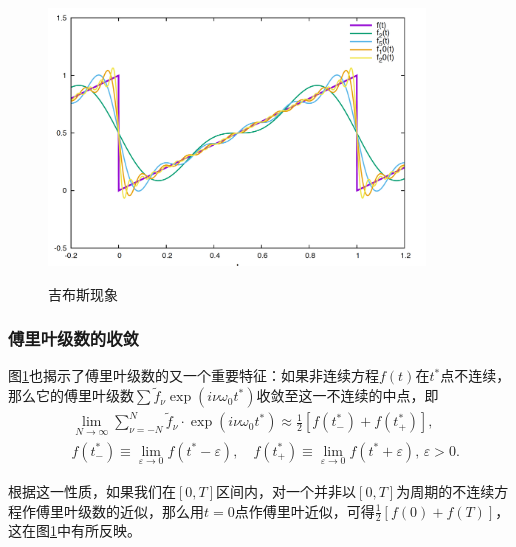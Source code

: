 \begin{figure}[htbp]
   \caption{吉布斯现象}
  \centering
  \includegraphics[width=10cm]{./Figures/20180305-gibbs-phenomenon.png}
  \label{fig:fourier-series-gibbs-phenomenon}
%
\end{figure}

\subsubsection{傅里叶级数的收敛}
\label{sec:fourier-series-convergence}

图\ref{fig:fourier-series-gibbs-phenomenon}也揭示了傅里叶级数的又一个重要特征：如果非连续方程$f(t)$在$t^{*}$点不连续，那么它的傅里叶级数$\sum \tilde{f}_{\nu} \exp \left( i \nu \omega_{0} t^{*} \right)$收敛至这一不连续的中点，即
\begin{equation*}
\begin{split}
  & \lim_{N \rightarrow \infty}
  \sum_{\nu = - N}^{N}
  \tilde{f}_{\nu} \cdot \exp \left( i \nu \omega_{0} t^{*} \right)
  \approx \frac{1}{2}
  \left[
  f \left( t_{-}^{*}\right) + f \left( t_{+}^{*}\right)
  \right], \\
  & f \left( t_{-}^{*}\right) \equiv \lim_{\varepsilon \rightarrow 0} f \left( t^{*} - \varepsilon \right), \quad f \left( t_{+}^{*}\right) \equiv \lim_{\varepsilon \rightarrow 0} f \left( t^{*} + \varepsilon \right), \, \varepsilon > 0.
\end{split}
\end{equation*}

根据这一性质，如果我们在$[0,T]$区间内，对一个并非以$[0,T]$为周期的不连续方程作傅里叶级数的近似，那么用$t=0$点作傅里叶近似，可得$\frac{1}{2} \left[ f(0) + f(T)\right]$，这在图\ref{fig:fourier-series-gibbs-phenomenon}中有所反映。


